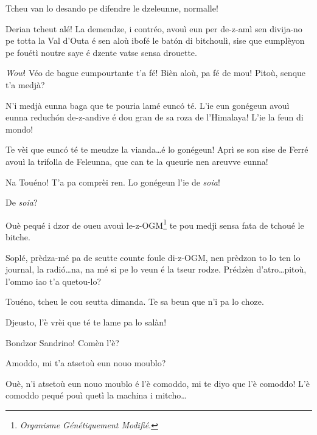 \begin{drama}
\Tuenospeaks{} Tcheu van lo desando pe difendre le dzeleunne, normalle!

\Gerominespeaks Derian tcheut alé! La demendze, i contréo, avouì eun per de-z-amì sen divija-no pe totta la Val d'Outa é sen aloù ibofé le bat\'on di bitchoulì, sise que eumplèyon pe fouétì noutre saye é dzente vatse sensa drouette.

\Tuenospeaks {} \textit{Wow}! Véo de bague eumpourtante t'a fé! Bièn aloù, pa fé de mou! Pitoù, senque t'a medjà? 

\Gerominespeaks N'i medjà eunna baga que te pouria lamé eunc\'o té. L'ie eun gonégeun avouì eunna reduch\'on de-z-andive é dou gran de sa roza de l'Himalaya! L'ie la feun di mondo!

\Tuenospeaks Te vèi que eunc\'o té te meudze la vianda\ldots é lo gonégeun! Aprì se son sise de Ferré avouì la trifolla de Feleunna, que can te la queurie nen areuvve eunna!

\Gerominespeaks Na Touéno! T'a pa comprèi ren. Lo gonégeun l'ie de \textit{soia}!

\Tuenospeaks De \textit{soia}?

\Gerominespeaks Ouè pequé i dzor de oueu avouì le-z-OGM\footnote{ \textit{Organisme Génétiquement Modifié}.} te pou medjì sensa fata de tchoué le bitche.

\Tuenospeaks{} Soplé, prèdza-mé pa de seutte counte foule di-z-OGM, nen prèdzon to lo ten lo journal, la radi\'o\ldots na, na mé si pe lo veun é la tseur rodze. Prédzèn d'atro\ldots pitoù, l’ommo iao t'a quetou-lo?

\Gerominespeaks{} Touéno, tcheu le cou seutta dimanda. Te sa beun que n'i pa lo choze.

\Tuenospeaks Djeusto, l'è vrèi que té te lame pa lo salàn! 





\Richardspeaks Bondzor Sandrino! Comèn l'è?

\Sandrinospeaks Amoddo, mi t'a atsetoù eun nouo moublo?

\Richardspeaks Ouè, n'i atsetoù eun nouo moublo é l'è comoddo,  mi te diyo que l'è comoddo! L'è comoddo pequé pouì quetì la machina i mitcho\ldots


\end{drama}
